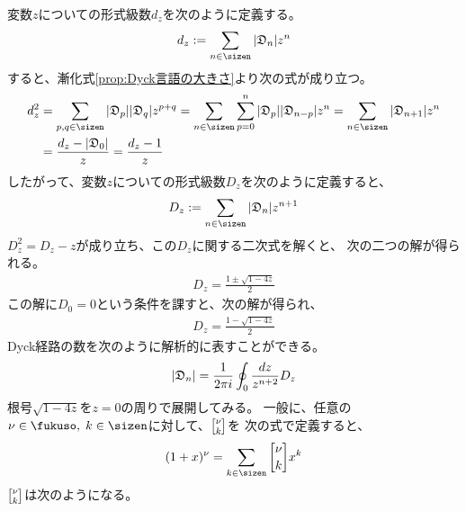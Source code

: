 {	変数$z$についての形式級数$d_z$を次のように定義する。
	\begin{equation*}\begin{split}
		d_z := \sum_{n\in\sizen}|\Dyck_n|z^n
	\end{split}\end{equation*}
	すると、漸化式\ref{prop:Dyck言語の大きさ}より次の式が成り立つ。
	\begin{equation*}\begin{split}
		d_z^2 &= \sum_{p,q\in\sizen} |\Dyck_p||\Dyck_q|z^{p+q}
		= \sum_{n\in\sizen}\sum_{p=0}^n |\Dyck_p||\Dyck_{n-p}|z^n
		= \sum_{n\in\sizen} |\Dyck_{n+1}|z^n \\
		&= \frac{d_z - |\Dyck_0|}{z} = \frac{d_z - 1}{z}
	\end{split}\end{equation*}
	したがって、変数$z$についての形式級数$D_z$を次のように定義すると、
	\begin{equation*}\begin{split}
		D_z := \sum_{n\in\sizen}|\Dyck_n|z^{n+1}
	\end{split}\end{equation*}
	$D_z^2 = D_z - z$が成り立ち、この$D_z$に関する二次式を解くと、
	次の二つの解が得られる。
	\begin{equation*}\begin{split}
		D_z = \frac{1\pm\sqrt{1 - 4z}}{2}
	\end{split}\end{equation*}
	この解に$D_0=0$という条件を課すと、次の解が得られ、
	\begin{equation*}\begin{split}
		D_z = \frac{1-\sqrt{1 - 4z}}{2}
	\end{split}\end{equation*}
	Dyck経路の数を次のように解析的に表すことができる。
	\begin{equation*}\begin{split}
		|{\mathfrak D}_n| = \frac{1}{2\pi i}\oint_{0}\frac{dz}{z^{n+2}} D_z
	\end{split}\end{equation*}
	根号$\sqrt{1-4z}$を$z=0$の周りで展開してみる。
	一般に、任意の$\nu\in\fukuso,\;k\in\sizen$に対して、$\cbinom{\nu}{k}$を
	次の式で定義すると、
	\begin{equation*}\begin{split}
		(1 + x)^\nu = \sum_{k\in\sizen}\cbinom{\nu}{k} x^k
	\end{split}\end{equation*}
	$\cbinom{\nu}{k}$は次のようになる。
}

